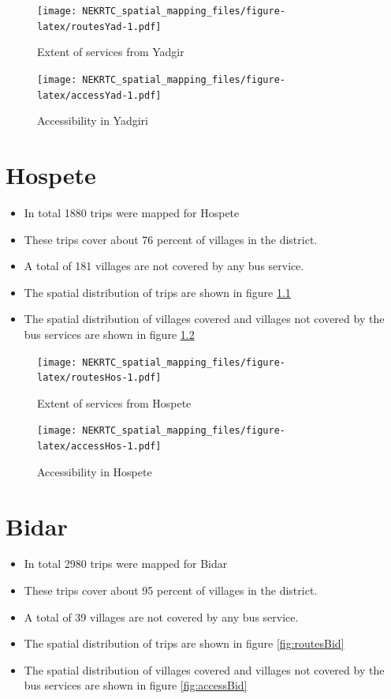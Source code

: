 \documentclass[
]{book}
\providecommand{\tightlist}{%
  \setlength{\itemsep}{0pt}\setlength{\parskip}{0pt}}
\begin{document}
\begin{figure}
\centering
\texttt{[image: NEKRTC\_spatial\_mapping\_files/figure-latex/routesYad-1.pdf]}
\caption{\label{fig:routesYad}Extent of services from Yadgir}
\end{figure}

\begin{figure}
\centering
\texttt{[image: NEKRTC\_spatial\_mapping\_files/figure-latex/accessYad-1.pdf]}
\caption{\label{fig:accessYad}Accessibility in Yadgiri}
\end{figure}

\hypertarget{hospete}{%
\chapter{Hospete}\label{hospete}}

\begin{itemize}
\tightlist
\item
  In total 1880 trips were mapped for Hospete
\item
  These trips cover about 76 percent of villages in the district.
\item
  A total of 181 villages are not covered by any bus service.
\item
  The spatial distribution of trips are shown in figure \ref{fig:routesHos}
\item
  The spatial distribution of villages covered and villages not covered by the bus services are shown in figure \ref{fig:accessHos}
\end{itemize}

\begin{figure}
\centering
\texttt{[image: NEKRTC\_spatial\_mapping\_files/figure-latex/routesHos-1.pdf]}
\caption{\label{fig:routesHos}Extent of services from Hospete}
\end{figure}

\begin{figure}
\centering
\texttt{[image: NEKRTC\_spatial\_mapping\_files/figure-latex/accessHos-1.pdf]}
\caption{\label{fig:accessHos}Accessibility in Hospete}
\end{figure}

\hypertarget{bidar}{%
\chapter{Bidar}\label{bidar}}

\begin{itemize}
\tightlist
\item
  In total 2980 trips were mapped for Bidar
\item
  These trips cover about 95 percent of villages in the district.
\item
  A total of 39 villages are not covered by any bus service.
\item
  The spatial distribution of trips are shown in figure \ref{fig:routesBid}
\item
  The spatial distribution of villages covered and villages not covered by the bus services are shown in figure \ref{fig:accessBid}
\end{itemize}
\end{document}
